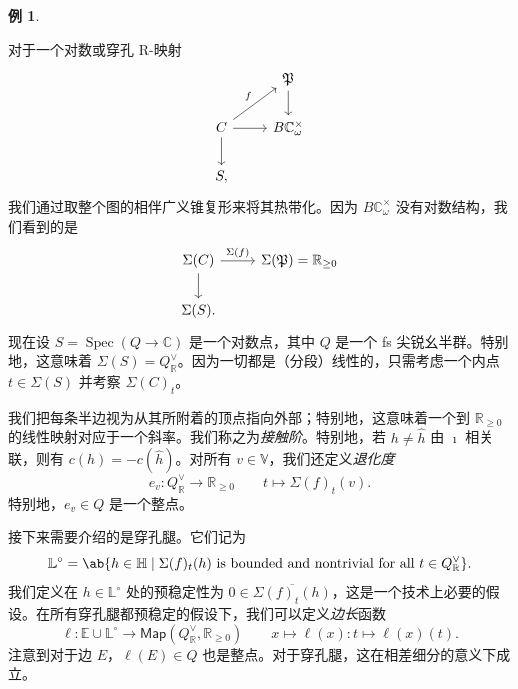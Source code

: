 \documentclass{amsart}
\theoremstyle{definition}
\newtheorem{exm}[thm]{例}
\theoremstyle{remark}
\theoremstyle{plain}
\theoremstyle{definition}
\theoremstyle{remark}
\newcommand{\R}{\mathbb{R}}
\newcommand{\C}{\mathbb{C}}
\newcommand{\E}{\mathbb{E}}
\newcommand{\V}{\mathbb{V}}
\renewcommand{\H}{\mathbb{H}}
\renewcommand{\L}{\mathbb{L}}
\newcommand{\mf}[1]{\mathfrak{#1}}
\newcommand{\ms}[1]{\mathsf{#1}}
\newcommand{\ol}[1]{\overline{#1}}
\newcommand{\1}{\mathbf{1}}
\newcommand{\2}{\mathbf{2}}
\newcommand{\3}{\mathbf{3}}
\DeclareMathOperator{\Spec}{Spec}
\begin{document}
\begin{exm}
\begin{center}
    \end{center}
\end{exm}

对于一个对数或穿孔 R-映射
\begin{equation*}
\begin{tikzcd}
    & \mf{P} \ar{d} \\
    C \ar{ur}{f} \ar{d} \ar{r} & B \C_{\omega}^{\times} \\
    S,
\end{tikzcd}
\end{equation*}
我们通过取整个图的相伴广义锥复形来将其热带化。因为 \(B \C_{\omega}^{\times}\) 没有对数结构，我们看到的是
\begin{equation*}
\begin{tikzcd}
    \Sigma(C) \ar{d} \ar{r}{\Sigma(f)} & \Sigma(\mf{P}) = \R_{\geq 0} \\
    \Sigma(S).
\end{tikzcd}
\end{equation*}
现在设 \(S = \Spec (Q \to \C)\) 是一个对数点，其中 \(Q\) 是一个 fs 尖锐幺半群。特别地，这意味着 \(\Sigma(S) = Q_{\R}^{\vee}\)。因为一切都是（分段）线性的，只需考虑一个内点 \(t \in \Sigma(S)\) 并考察 \(\Sigma(C)_t\)。

我们把每条半边视为从其所附着的顶点指向外部；特别地，这意味着一个到 \(\R_{\geq 0}\) 的线性映射对应于一个斜率。我们称之为\textit{接触阶}。特别地，若 \(h \neq \hat{h}\) 由 \(\imath\) 相关联，则有 \(c(h) = - c(\hat{h})\)。对所有 \(v \in \V\)，我们还定义\textit{退化度}
\[ e_v \colon Q_{\R}^{\vee} \to \R_{\geq 0} \qquad t \mapsto \Sigma(f)_t (v). \]
特别地，\(e_v \in Q\) 是一个整点。

接下来需要介绍的是穿孔腿。它们记为
\[ \L^{\circ} = \ab\{ h \in \H \mid \Sigma(f)_t(h) \text{ is bounded and nontrivial for all } t \in Q_{\R}^{\vee}\}. \] 
我们定义在 \(h \in \L^{\circ}\) 处的预稳定性为 \(0 \in \ol{\Sigma(f)_t(h)}\)，这是一个技术上必要的假设。在所有穿孔腿都预稳定的假设下，我们可以定义\textit{边长}函数
\[ \ell \colon \E \cup \L^{\circ} \to \ms{Map}(Q_{\R}^{\vee}, \R_{\geq 0}) \qquad x \mapsto \ell(x) \colon t \mapsto \ell(x)(t). \]
注意到对于边 \(E\)，\(\ell(E) \in Q\) 也是整点。对于穿孔腿，这在相差细分的意义下成立。
\end{document}
